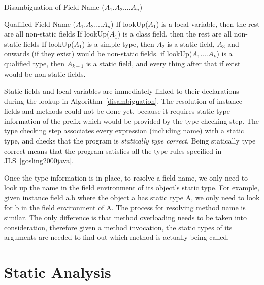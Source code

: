 \documentclass[a4paper, notitlepage]{report}
\begin{document}
\begin{algorithm}                      %
\caption{Disambiguation of Field Name ($A_1.A_2....A_n$)}          %
\label{disambiguation}                           %
\begin{algorithmic}[1]
\Require Qualified Field Name ($A_1.A_2....A_n$)
\State If lookUp($A_1$) is a local variable, then the rest are all non-static fields 
\State If lookUp($A_1$) is a  class field, then the rest are all non-static fields
\State If lookUp($A_1$) is a simple type, then $A_2$ is a static field, $A_3$ and onwards (if they exist) would be non-static fields.
\State if lookUp($A_1....A_k$) is a qualified type, then $A_{k+1}$ is a static field, and every thing after that if exist would be non-static fields.

\end{algorithmic}
\end{algorithm}

Static fields and local variables are immediately linked to their declarations during the lookup in Algorithm~\ref{disambiguation}. The resolution of instance fields and methods could not be done yet, because it requires static type information of the prefix which would be provided by the type checking step. The type checking step associates every expression (including name) with a static type, and checks that the program is \emph{statically type correct}. Being statically type correct means that the program satisfies all the type rules specified in JLS~\ref{gosling2000java}. 

Once the type information is in place, to resolve a field name, we only need to look up the name in the field environment of its object's static type. For example, given instance field a.b where the object a has static type A, we only need to look for b in the field environment of A. The process for resolving method name is similar. The only difference is that method overloading needs to be taken into consideration, therefore given a method invocation, the static types of its arguments are needed to find out which method is actually being called.



\section{Static Analysis}
\end{document}
